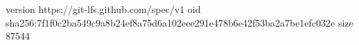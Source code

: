 version https://git-lfs.github.com/spec/v1
oid sha256:7f1f0c2ba549c9a8b24ef8a75d6a102eee291e478b6e42f53ba2a7be1efc032e
size 87544
